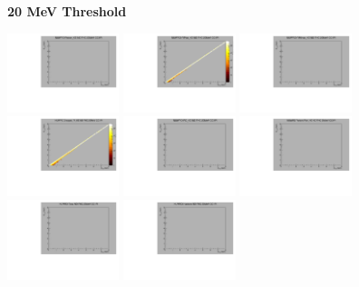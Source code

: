 \textbf{20 MeV Threshold}

\begin{center}

  \includegraphics[width=0.245\textwidth]{plots/response_matrix/Proton_KE_FHC_CC1Pi_20MeV.pdf}
  \includegraphics[width=0.245\textwidth]{plots/response_matrix/PiPlus_KE_FHC_CC1Pi_20MeV.pdf}
  \includegraphics[width=0.245\textwidth]{plots/response_matrix/PiMinus_KE_FHC_CC1Pi_20MeV.pdf}
  \includegraphics[width=0.245\textwidth]{plots/response_matrix/Charged_Pi_KE_FHC_CC1Pi_20MeV.pdf}
  \includegraphics[width=0.245\textwidth]{plots/response_matrix/Pi0_KE_FHC_CC1Pi_20MeV.pdf}
  \includegraphics[width=0.245\textwidth]{plots/response_matrix/Proton+Pion_KE_FHC_CC1Pi_20MeV.pdf}
  \includegraphics[width=0.245\textwidth]{plots/response_matrix/Total_FHC_CC1Pi_20MeV.pdf}
  \includegraphics[width=0.245\textwidth]{plots/response_matrix/Hadrons_FHC_CC1Pi_20MeV.pdf}

\end{center}

